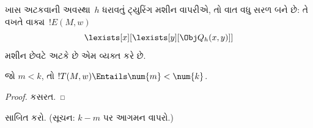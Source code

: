 ખાસ અટકવાની અવસ્થા~$h$ ધરાવતું ટ્યુરિંગ મશીન
વાપરીએ, તો વાત વધુ સરળ બને છે: તે વખતે
વાક્ય~$!E(M, w)$
\[
\lexists[x][\lexists[y][\Obj Q_h(x, y)]]
\]
મશીન છેવટે અટકે છે એમ વ્યક્ત કરે છે.

\begin{prop}
જો $m < k$, તો $!T(M, w) \Entails \num{m} < \num{k}$.
\end{prop}

\begin{proof}
કસરત.
\end{proof}

\begin{prob}
 સાબિત કરો.
(સૂચન: $k-m$ પર આગમન વાપરો.)
\end{prob}
\endgroup


\begingroup
\makeatletter{}\makeatother

\label{guunit:OLP-0271}


